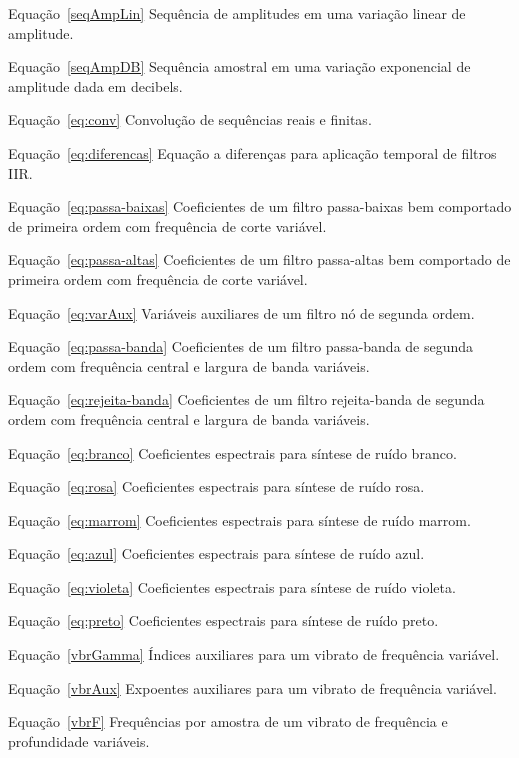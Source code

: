 \begin{listaespecial}[BIGNAMEWIDTH]
        \item[Equação~\ref{seqAmpLin}] Sequência de amplitudes em uma variação linear de amplitude.
        \item[Equação~\ref{seqAmpDB}] Sequência amostral em uma variação exponencial de amplitude dada em decibels.
        \item[Equação~\ref{eq:conv}] Convolução de sequências reais e finitas.
        \item[Equação~\ref{eq:diferencas}] Equação a diferenças para aplicação temporal de filtros IIR.
        \item[Equação~\ref{eq:passa-baixas}] Coeficientes de um filtro passa-baixas bem comportado de primeira ordem com frequência de corte variável.
        \item[Equação~\ref{eq:passa-altas}] Coeficientes de um filtro passa-altas bem comportado de primeira ordem com frequência de corte variável.
        \item[Equação~\ref{eq:varAux}] Variáveis auxiliares de um filtro nó de segunda ordem.
        \item[Equação~\ref{eq:passa-banda}] Coeficientes de um filtro passa-banda de segunda ordem com frequência central e largura de banda variáveis.
        \item[Equação~\ref{eq:rejeita-banda}] Coeficientes de um filtro rejeita-banda de segunda ordem com frequência central e largura de banda variáveis.
        \item[Equação~\ref{eq:branco}] Coeficientes espectrais para síntese de ruído branco.
        \item[Equação~\ref{eq:rosa}] Coeficientes espectrais para síntese de ruído rosa.
        \item[Equação~\ref{eq:marrom}] Coeficientes espectrais para síntese de ruído marrom.
        \item[Equação~\ref{eq:azul}] Coeficientes espectrais para síntese de ruído azul.
        \item[Equação~\ref{eq:violeta}] Coeficientes espectrais para síntese de ruído violeta.
        \item[Equação~\ref{eq:preto}] Coeficientes espectrais para síntese de ruído preto.
        \item[Equação~\ref{vbrGamma}] Índices auxiliares para um vibrato de frequência variável.
        \item[Equação~\ref{vbrAux}] Expoentes auxiliares para um vibrato de frequência variável.
        \item[Equação~\ref{vbrF}] Frequências por amostra de um vibrato de frequência e profundidade variáveis.

\end{listaespecial}
